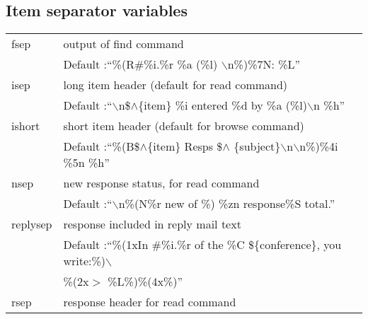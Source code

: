 \documentclass[twoside]{report}
\begin{document}

      \subsection{Item separator variables}

      \tablelasttail{\hline}
      \begin{supertabular}{ll}
          fsep &  output of find command \\
             & \hspace{1cm} Default :``\%(R\#\%i.\%r \%a (\%l) 
               $\backslash$n\%)\%7N: \%L'' \\
          isep &  long item header (default for read command) \\
             & \hspace{1cm} Default :``$\backslash$n\$$\wedge$\{item\} 
               \%i entered \%d by \%a (\%l)$\backslash$n \%h''\\
          ishort & short item header (default for browse command) \\
             & \hspace{1cm} Default :``\%(B\$$\wedge$\{item\} Resps \$$\wedge$
               \{subject\}$\backslash$n$\backslash$n\%)\%4i \%5n \%h'' \\
          nsep &    new response status, for read command\\
             & \hspace{1cm} Default :``$\backslash$n\%(N\%r new of \%)
               \%zn response\%S total.''\\
          replysep & response included in reply mail text\\
             & \hspace{1cm} Default :``\%(1xIn \#\%i.\%r of the \%C 
               \$\{conference\}, you write:\%)$\backslash$\\
             & \hspace{1cm}\%(2x$>$ \%L\%)\%(4x\%)''\\
         rsep & response header for read command\\

\end{supertabular}
\end{document}
